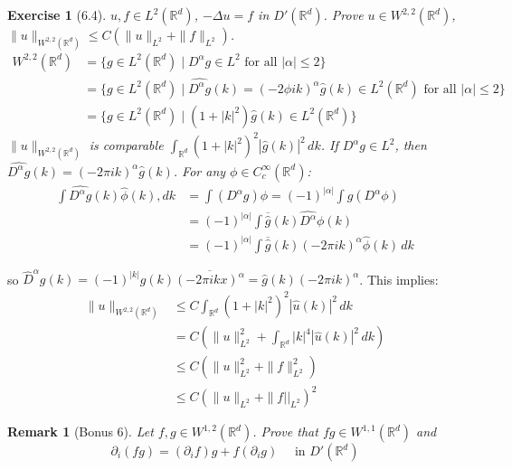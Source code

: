 \documentclass{report}
\theoremstyle{tommy}
\newtheorem{rem}[defn]{Remark}
\newtheorem{ex}[defn]{Exercise}
\begin{document}
  \begin{ex}[6.4]
    \(u, f \in L^2(\mathbb{R}^d)\), \(-\Delta u = f \) in \(D'(\mathbb{R}^d)\). Prove \(u \in W^{2,2}(\mathbb{R}^d)\), \(\|u\|_{W^{2,2}(\mathbb{R}^d)} \le C \left(\|u\|_{L^2} + \|f\|_{L^2}\right)\).
    \begin{align*}
      W^{2,2}(\mathbb{R}^d)
      &= \{g \in L^2(\mathbb{R}^d) \mid D^\alpha g \in L^2 \text{ for all } |\alpha| \le 2\} \\
      &= \{g \in L^2(\mathbb{R}^d) \mid \widehat{D^\alpha g}(k) = (-2 \phi ik)^\alpha \hat g(k) \in L^2(\mathbb{R}^d) \text{ for all } |\alpha| \le 2\} \\
      &= \{g \in L^2(\mathbb{R}^d) \mid (1 + |k|^2) \hat g (k) \in L^2(\mathbb{R}^d)\}
    \end{align*}
    \(\|u\|_{W^{2,2}(\mathbb{R}^d)}\) is comparable \(\int_{\mathbb{R}^d} (1 + |k|^2)^2 |\hat g(k)|^2 \, dk\). If \(D^\alpha g \in L^2\), then \(\widehat{D^\alpha g}(k) = (-2 \pi i k)^\alpha \hat g(k)\). For any \(\phi \in C_c^\infty(\mathbb{R}^d)\): 
    \begin{align*}
      \int \widehat{D^\alpha g} (k) \hat \phi (k) , dk
      &= \int (D^\alpha g) \phi = (-1)^{|\alpha|} \int g (D^\alpha \phi) \\
      &= (-1)^{|\alpha|} \int \overline{\widehat{g}}(k) \widehat{D^\alpha} \phi(k) \\
      &= (-1)^{|\alpha|} \int \overline{\widehat{g}}(k)(-2 \pi i k)^\alpha \hat \phi(k) \, dk
    \end{align*}
  \end{ex}
  so \(\hat D^\alpha g(k) = (-1)^{|k|} \hat g (k) \overline{(-2 \pi i k x)^\alpha} = \hat g(k)(-2 \pi ik)^\alpha\). This implies:
  \begin{align*}
    \|u\|_{W^{2,2}(\mathbb{R}^d)} 
    &\le C \int_{\mathbb{R}^d} (1 + |k|^2)^2 |\hat u(k)|^2 \, dk \\
    &= C \left(\|u\|_{L^2}^2  + \int_{\mathbb{R}^d} |k|^4 |\hat u(k)|^2 \, dk\right) \\
    &\le C \left(\|u\|_{L^2}^2 + \|f\|_{L^2}^2\right) \\
    &\le C(\| u\|_{L^2} + \|f||_{L^2})^2
  \end{align*}

  \begin{rem}[Bonus 6]
    Let \(f,g \in W^{1,2}(\mathbb{R}^d)\). Prove that \(fg \in W^{1,1}(\mathbb{R}^d)\) and 
    \[\partial_i (fg) = (\partial_i f) g + f(\partial_i g) \quad \text{ in } D'(\mathbb{R}^d)\]
  \end{rem}
\end{document}
